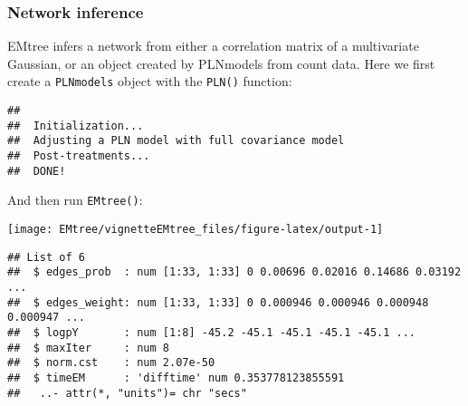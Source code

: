 \subsubsection{Network inference}\label{network-inference}

EMtree infers a network from either a correlation matrix of a
multivariate Gaussian, or an object created by PLNmodels from count
data. Here we first create a \texttt{PLNmodels} object with
the \texttt{PLN()} function:

\begin{Shaded}
\begin{Highlighting}[]
\OperatorTok{~}\StringTok{ }\OperatorTok{\$}
\end{Highlighting}
\end{Shaded}

\begin{verbatim}
## 
##  Initialization...
##  Adjusting a PLN model with full covariance model
##  Post-treatments...
##  DONE!
\end{verbatim}

And then run \texttt{EMtree()}:

\begin{Shaded}
\begin{Highlighting}[]
 \NormalTok{, }\NormalTok{, }\NormalTok{)}
\end{Highlighting}
\end{Shaded}

\begin{center}\texttt{[image: EMtree/vignetteEMtree\_files/figure-latex/output-1]} \end{center}

\begin{Shaded}
\begin{Highlighting}[]
\end{Highlighting}
\end{Shaded}

\begin{verbatim}
## List of 6
##  $ edges_prob  : num [1:33, 1:33] 0 0.00696 0.02016 0.14686 0.03192 ...
##  $ edges_weight: num [1:33, 1:33] 0 0.000946 0.000946 0.000948 0.000947 ...
##  $ logpY       : num [1:8] -45.2 -45.1 -45.1 -45.1 -45.1 ...
##  $ maxIter     : num 8
##  $ norm.cst    : num 2.07e-50
##  $ timeEM      : 'difftime' num 0.353778123855591
##   ..- attr(*, "units")= chr "secs"
\end{verbatim}

